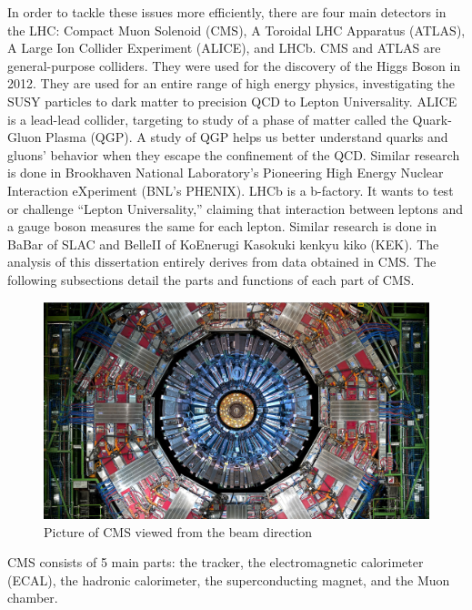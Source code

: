In order to tackle these issues more efficiently, there are four main detectors in the LHC: Compact Muon Solenoid (CMS), A Toroidal LHC Apparatus (ATLAS), A Large Ion Collider Experiment (ALICE), and LHCb.
CMS and ATLAS are general-purpose colliders. They were used for the discovery of the Higgs Boson in 2012. They are used for an entire range of high energy physics, investigating the SUSY particles to dark matter to precision QCD to Lepton Universality.
ALICE is a lead-lead collider, targeting to study of a phase of matter called the Quark-Gluon Plasma (QGP). A study of QGP helps us better understand quarks and gluons' behavior when they escape the confinement of the QCD.
Similar research is done in Brookhaven National Laboratory's Pioneering High Energy Nuclear Interaction eXperiment (BNL's PHENIX).
LHCb is a b-factory. It wants to test or challenge ``Lepton Universality,'' claiming that interaction between leptons and a gauge boson measures the same for each lepton.
Similar research is done in BaBar of SLAC and BelleII of KoEnerugi Kasokuki kenkyu kiko (KEK).
The analysis of this dissertation entirely derives from data obtained in CMS.
The following subsections detail the parts and functions of each part of CMS.
\begin{figure}[h!]
	\caption{Picture of CMS viewed from the beam direction \cite{det}}
  \label{fig:cms}
  \centering
  \includegraphics[width=1.0\linewidth]{figs/cms.png}
\end{figure}
CMS consists of 5 main parts: the tracker, the electromagnetic calorimeter (ECAL), the hadronic calorimeter, the superconducting magnet, and the Muon chamber.

